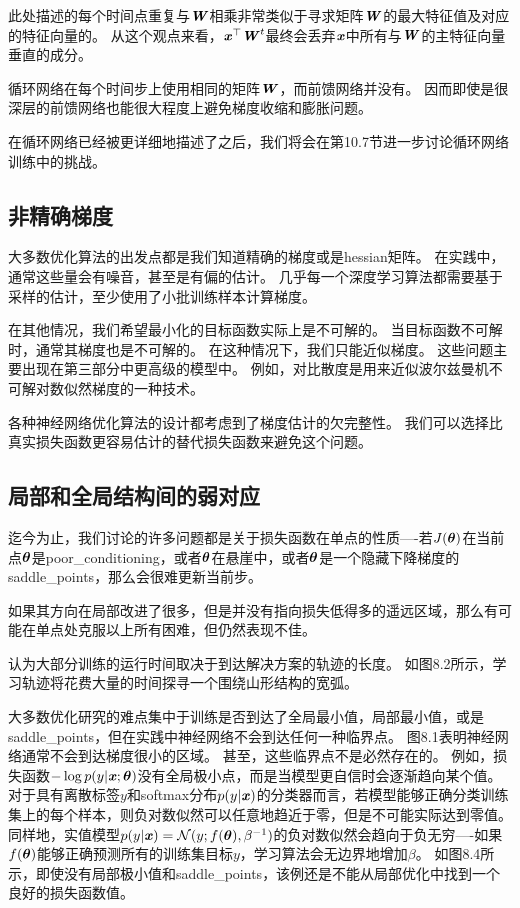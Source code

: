 此处描述的每个时间点重复与$\boldsymbol{\mathit{W}}$相乘非常类似于寻求矩阵$\boldsymbol{\mathit{W}}$的最大特征值及对应的特征向量的。
从这个观点来看，$\boldsymbol{\mathit{x}}^\top\boldsymbol{\mathit{W}}^t$最终会丢弃$\boldsymbol{\mathit{x}}$中所有与$\boldsymbol{\mathit{W}}$的主特征向量垂直的成分。

循环网络在每个时间步上使用相同的矩阵$\boldsymbol{\mathit{W}}$，而前馈网络并没有。
因而即使是很深层的前馈网络也能很大程度上避免梯度收缩和膨胀问题\citep{Sussillo14}。

在循环网络已经被更详细地描述了之后，我们将会在第10.7节进一步讨论循环网络训练中的挑战。

\subsection{非精确梯度}
\label{sec:inexact_gradients}
大多数优化算法的出发点都是我们知道精确的梯度或是\gls{hessian}矩阵。
在实践中，通常这些量会有噪音，甚至是有偏的估计。
几乎每一个深度学习算法都需要基于采样的估计，至少使用了小批训练样本计算梯度。


在其他情况，我们希望最小化的目标函数实际上是不可解的。
当目标函数不可解时，通常其梯度也是不可解的。
在这种情况下，我们只能近似梯度。
这些问题主要出现在第三部分中更高级的模型中。
例如，对比散度是用来近似波尔兹曼机不可解对数似然梯度的一种技术。

各种神经网络优化算法的设计都考虑到了梯度估计的欠完整性。
我们可以选择比真实损失函数更容易估计的替代损失函数来避免这个问题。

\subsection{局部和全局结构间的弱对应}
\label{sec:poor_correspondence_between_local_and_global_structure}
迄今为止，我们讨论的许多问题都是关于损失函数在单点的性质----若$J(\boldsymbol{\theta})$在当前点$\boldsymbol{\theta}$是\gls{poor_conditioning}，或者$\boldsymbol{\theta}$在悬崖中，或者$\boldsymbol{\theta}$是一个隐藏下降梯度的\gls{saddle_points}，那么会很难更新当前步。

如果其方向在局部改进了很多，但是并没有指向损失低得多的遥远区域，那么有可能在单点处克服以上所有困难，但仍然表现不佳。

\cite{GoodfellowOptimization15}认为大部分训练的运行时间取决于到达解决方案的轨迹的长度。 
如图8.2所示，学习轨迹将花费大量的时间探寻一个围绕山形结构的宽弧。

大多数优化研究的难点集中于训练是否到达了全局最小值，局部最小值，或是\gls{saddle_points}，但在实践中神经网络不会到达任何一种临界点。
图8.1表明神经网络通常不会到达梯度很小的区域。
甚至，这些临界点不是必然存在的。
例如，损失函数$-\log p(y|\boldsymbol{\mathit{x}};\boldsymbol{\theta})$没有全局极小点，而是当模型更自信时会逐渐趋向某个值。    
对于具有离散标签$y$和softmax分布$p(y|\boldsymbol{\mathit{x}})$的分类器而言，若模型能够正确分类训练集上的每个样本，则负对数似然可以任意地趋近于零，但是不可能实际达到零值。
同样地，实值模型$p(y|\boldsymbol{\mathit{x}}) = \mathcal{N}(y;f(\boldsymbol{\theta}),\beta^{-1})$的负对数似然会趋向于负无穷----如果$f(\boldsymbol{\theta})$能够正确预测所有的训练集目标$y$，学习算法会无边界地增加$\beta$。
如图8.4所示，即使没有局部极小值和\gls{saddle_points}，该例还是不能从局部优化中找到一个良好的损失函数值。

